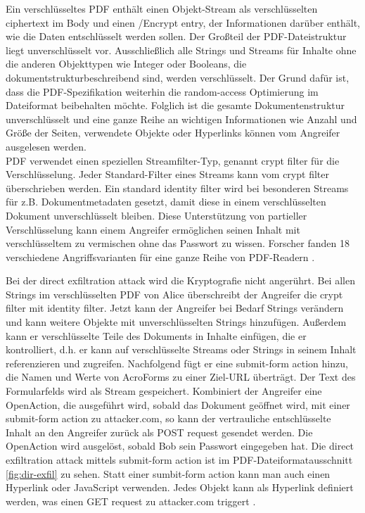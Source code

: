 Ein verschlüsseltes PDF enthält einen Objekt-Stream als verschlüsselten ciphertext im Body und einen /Encrypt entry, der Informationen darüber enthält, wie die Daten entschlüsselt werden sollen. Der Großteil der PDF-Dateistruktur liegt unverschlüsselt vor. Ausschließlich alle Strings und Streams für Inhalte ohne die anderen Objekttypen wie Integer oder Booleans, die dokumentstrukturbeschreibend sind, werden verschlüsselt. Der Grund dafür ist, dass die PDF-Spezifikation weiterhin die random-access Optimierung im Dateiformat beibehalten möchte. Folglich ist die gesamte Dokumentenstruktur unverschlüsselt und eine ganze Reihe an wichtigen Informationen wie Anzahl und Größe der Seiten, verwendete Objekte oder Hyperlinks können vom Angreifer ausgelesen werden. \\
PDF verwendet einen speziellen Streamfilter-Typ, genannt crypt filter für die Verschlüsselung. Jeder Standard-Filter eines Streams kann vom crypt filter überschrieben werden. Ein standard identity filter wird bei besonderen Streams für z.B. Dokumentmetadaten gesetzt, damit diese in einem verschlüsselten Dokument unverschlüsselt bleiben. Diese Unterstützung von partieller Verschlüsselung kann einem Angreifer ermöglichen seinen Inhalt mit verschlüsseltem zu vermischen ohne das Passwort zu wissen. Forscher fanden 18 verschiedene Angriffsvarianten für eine ganze Reihe von PDF-Readern \cite{ccc-break-pdf}.
\par
Bei der direct exfiltration attack wird die Kryptografie nicht angerührt. Bei allen Strings im verschlüsselten PDF von Alice überschreibt der Angreifer die crypt filter mit identity filter. Jetzt kann der Angreifer bei Bedarf Strings verändern und kann weitere Objekte mit unverschlüsselten Strings hinzufügen. Außerdem kann er verschlüsselte Teile des Dokuments in Inhalte einfügen, die er kontrolliert, d.h. er kann auf verschlüsselte Streams oder Strings in seinem Inhalt referenzieren und zugreifen. Nachfolgend fügt er eine submit-form action hinzu, die Namen und Werte von AcroForms zu einer Ziel-URL überträgt. Der Text des Formularfelds wird als Stream gespeichert. Kombiniert der Angreifer eine OpenAction, die ausgeführt wird, sobald das Dokument geöffnet wird, mit einer submit-form action zu attacker.com, so kann der vertrauliche entschlüsselte Inhalt an den Angreifer zurück als POST request gesendet werden. Die OpenAction wird ausgelöst, sobald Bob sein Passwort eingegeben hat. Die direct exfiltration attack mittels submit-form action ist im PDF-Dateiformatausschnitt \ref{fig:dir-exfil} zu sehen. Statt einer sumbit-form action kann man auch einen Hyperlink oder JavaScript verwenden. Jedes Objekt kann als Hyperlink definiert werden, was einen GET request zu attacker.com triggert \cite{ccc-break-pdf, pdfex}. 
\par

